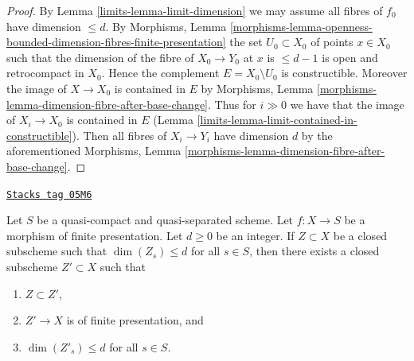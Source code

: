 \begin{proof}

By Lemma \ref{limits-lemma-limit-dimension} we may assume all fibres
of $f_0$ have dimension $\leq d$. By Morphisms, Lemma
\ref{morphisms-lemma-openness-bounded-dimension-fibres-finite-presentation}
the set $U_0 \subset X_0$ of points $x \in X_0$ such that
the dimension of the fibre of $X_0 \to Y_0$ at $x$ is $\leq d - 1$
is open and retrocompact in $X_0$. Hence the complement
$E = X_0 \setminus U_0$ is constructible.
Moreover the image of $X \to X_0$ is contained in $E$
by Morphisms, Lemma \ref{morphisms-lemma-dimension-fibre-after-base-change}.
Thus for $i \gg 0$ we have that the image
of $X_i \to X_0$ is contained in $E$
(Lemma \ref{limits-lemma-limit-contained-in-constructible}). Then all fibres
of $X_i \to Y_i$ have dimension $d$ by the aforementioned
Morphisms, Lemma \ref{morphisms-lemma-dimension-fibre-after-base-change}.
\end{proof}

\begin{lemma}
\label{limits-lemma-approximate-given-relative-dimension}
\href{https://stacks.math.columbia.edu/tag/05M6}{\texttt{Stacks tag 05M6}}

Let $S$ be a quasi-compact and quasi-separated scheme.
Let $f : X \to S$ be a morphism of finite presentation.
Let $d \geq 0$ be an integer.
If $Z \subset X$ be a closed subscheme such that
$\dim(Z_s) \leq d$ for all $s \in S$, then there exists a
closed subscheme $Z' \subset X$ such that
\begin{enumerate}
\item $Z \subset Z'$,
\item $Z' \to X$ is of finite presentation, and
\item $\dim(Z'_s) \leq d$ for all $s \in S$.
\end{enumerate}
\end{lemma}

